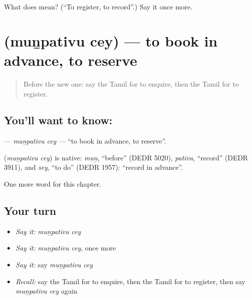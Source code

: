 \begin{tcolorbox}[breakable,colback=teal!4,colframe=teal!35!black,title={Before you move on}]
What does   mean? (\textquotedblleft{}To register, to record\textquotedblright{}.) Say it once more.
\end{tcolorbox}
\section[\texorpdfstring{\ta{முன்பதிவு} \ta{செய்} (muṉpativu cey)}{முன்பதிவு செய் (muṉpativu cey)}]{  (muṉpativu cey) — to book in advance, to reserve}

\label{lesson:TA-C227-munpativu-cey}



\begin{quote}
Before the new one: say the Tamil for to enquire, then the Tamil for to register.
\end{quote}

\subsection*{You'll want to know:  }
\textbf{ } — \emph{muṉpativu cey} — \textquotedblleft{}to book in advance, to reserve\textquotedblright{}.

\begin{cousinweb}
\textbf{ } (\emph{muṉpativu cey}) is native: \emph{muṉ}, \textquotedblleft{}before\textquotedblright{} (DEDR 5020), \emph{pativu}, \textquotedblleft{}record\textquotedblright{} (DEDR 3911), and \emph{sey}, \textquotedblleft{}to do\textquotedblright{} (DEDR 1957): \textquotedblleft{}record in advance\textquotedblright{}.
\end{cousinweb}

\begin{grammarlens}[title={What you've built}]
One more word for this chapter.
\end{grammarlens}

\subsection*{Your turn}
\begin{itemize}
\raggedright
  \item \emph{Say it:} \emph{muṉpativu cey}
  \item \emph{Say it:} \emph{muṉpativu cey}, once more
  \item \emph{Say it:} say \emph{muṉpativu cey}
  \item \emph{Recall:} say the Tamil for to enquire, then the Tamil for to register, then say \emph{muṉpativu cey} again
\end{itemize}

